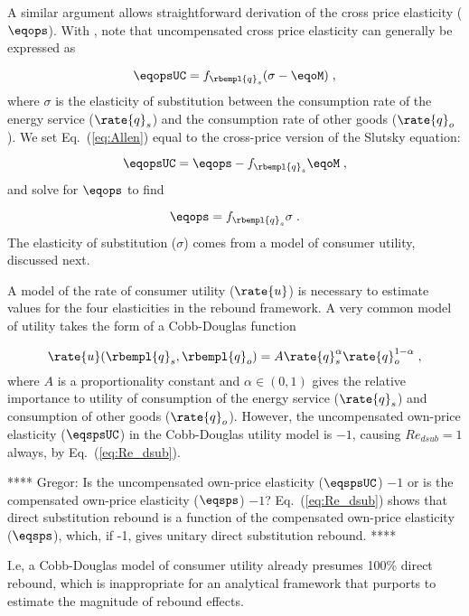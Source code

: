 A similar argument allows straightforward derivation 
of the cross price elasticity ($\eqops$).
With \citet{Hicks1934}, 
note that uncompensated cross price elasticity can generally be expressed as

\begin{equation} \label{eq:Allen}
  \eqopsUC = f_{\rbempl{q}_s} (\sigma - \eqoM) \; ,
\end{equation}
%
where $\sigma$ is the elasticity of substitution 
between the consumption rate of the energy service ($\rate{q}_s$) and
the consumption rate of other goods ($\rate{q}_o$). 
We set Eq.~(\ref{eq:Allen}) equal to 
the cross-price version of the Slutsky equation:

\begin{equation} \label{eq:slutsky_cross}
  \eqopsUC = \eqops - f_{\rbempl{q}_s} \eqoM \; ,
\end{equation}
%
and solve for $\eqops$ to find

\begin{equation} \label{eq:eqops_general}
  \eqops = f_{\rbempl{q}_s} \sigma \; .
\end{equation}
%
The elasticity of substitution ($\sigma$)
comes from a model of consumer utility, discussed next.

A model of the rate of consumer utility ($\rate{u}$)
is necessary to estimate values for the four elasticities
in the rebound framework.
A very common model of utility takes the form of a Cobb-Douglas function

\begin{equation} \label{eq:CD_utility}
  \rate{u}(\rbempl{q}_s,\rbempl{q}_o) = A \rate{q}_s^\alpha \rate{q}_o^{1 - \alpha} \; ,
\end{equation}
%
where $A$ is a proportionality constant and 
$\alpha \in (0,1)$ gives the relative importance to utility 
of consumption of the energy service ($\rate{q}_s$)
and consumption of other goods ($\rate{q}_o$). 
However, the uncompensated own-price elasticity ($\eqspsUC$) 
in the Cobb-Douglas utility model is $-1$, 
causing $Re_{dsub} = 1$ always,
by Eq.~(\ref{eq:Re_dsub}).

**** Gregor: Is the uncompensated own-price elasticity ($\eqspsUC$) $-1$ 
or is the compensated own-price elasticity ($\eqsps$) $-1$?
Eq.~(\ref{eq:Re_dsub}) shows that direct substitution rebound is a function of the 
compensated own-price elasticity ($\eqsps$), which, if -1, gives unitary direct substitution rebound.
****

I.e, a Cobb-Douglas model of consumer utility already presumes 100\% direct rebound,
which is inappropriate for an analytical framework that purports to 
estimate the magnitude of rebound effects.

